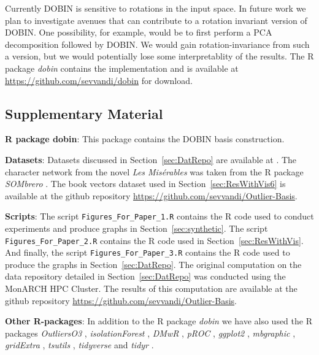 \documentclass[letter,12pt]{article}
\begin{document}
Currently DOBIN is sensitive to rotations in the input space. In future work we plan to investigate avenues that can contribute to a rotation invariant version of DOBIN. One possibility, for example, would be to first perform a PCA decomposition followed by DOBIN. We would gain rotation-invariance from such a version, but we would potentially lose some interpretablity of the results. The R package \textit{dobin} contains the implementation and is available at \url{https://github.com/sevvandi/dobin} for download.

\clearpage

\subsection*{Supplementary Material}

\textbf{R package dobin}: This package contains the DOBIN basis construction.

\textbf{Datasets}: Datasets discussed in Section~\ref{sec:DatRepo} are available at \cite{datasets}. The character network from the novel \textit{Les Mis\'erables} was taken from the R package \textit{SOMbrero} \citep{sombrero}. The book vectors dataset used in Section~\ref{sec:ResWithVis6} is available at the github repository \url{https://github.com/sevvandi/Outlier-Basis}.

\textbf{Scripts}: The script \texttt{Figures\_For\_Paper\_1.R} contains the R code used to conduct experiments and produce graphs in Section~\ref{sec:synthetic}. The script \texttt{Figures\_For\_Paper\_2.R} contains the R code used in Section~\ref{sec:ResWithVis}. And finally, the script \texttt{Figures\_For\_Paper\_3.R} contains the R code used to produce the graphs in Section~\ref{sec:DatRepo}. The original computation on the data repository detailed in Section~\ref{sec:DatRepo} was conducted using the MonARCH HPC Cluster. The results of this computation are available at the github repository \url{https://github.com/sevvandi/Outlier-Basis}.

\textbf{Other R-packages}: In addition to the R package \textit{dobin} we have also used the R packages \textit{OutliersO3} \citep{O3Rpack}, \textit{isolationForest} \citep{isolationForest}, \textit{DMwR} \citep{DMwR}, \textit{pROC} \citep{pROC}, \textit{ggplot2} \citep{ggplot2}, \textit{mbgraphic} \citep{mbgraphic}, \textit{gridExtra} \citep{gridextra}, \textit{tsutils} \citep{tsutils}, \textit{tidyverse} \citep{tidyverse} and \textit{tidyr} \citep{tidyr}.%
\end{document}
